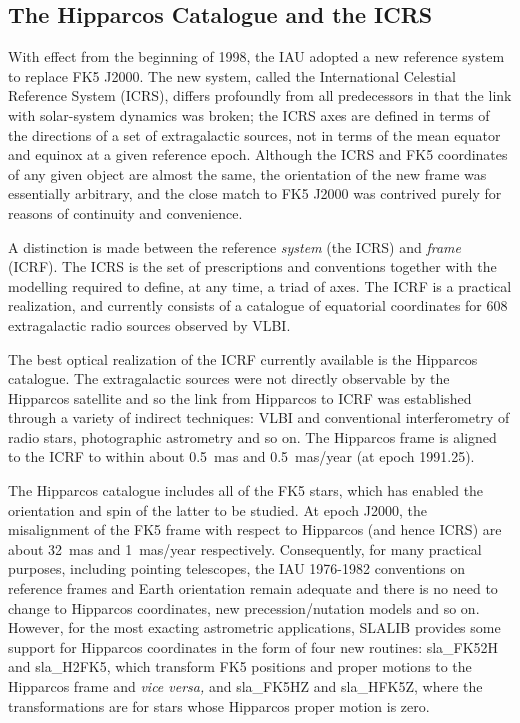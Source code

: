 \documentclass[11pt,twoside]{article}
\begin{document}
\subsection{The Hipparcos Catalogue and the ICRS}
With effect from the beginning of 1998, the IAU adopted a new
reference system to replace FK5 J2000.  The new system, called the
International Celestial Reference System (ICRS), differs profoundly
from all predecessors in that the link with solar-system dynamics
was broken;  the ICRS axes are defined in terms of the directions
of a set of extragalactic sources, not in terms of the mean equator and
equinox at a given reference epoch.  Although the ICRS and FK5 coordinates
of any given object are almost the same, the orientation of the new frame
was essentially arbitrary, and the close match to FK5 J2000 was contrived
purely for reasons of continuity and convenience.

A distinction is made between the reference {\it system}\/ (the ICRS)
and {\it frame}\/ (ICRF).  The ICRS is the set of prescriptions and
conventions together with the modelling required to define, at any
time, a triad of axes.  The ICRF is a practical realization, and
currently consists of a catalogue of equatorial coordinates for 608
extragalactic radio sources observed by VLBI.

The best optical realization of the ICRF currently available is the
Hipparcos catalogue.  The extragalactic sources were not directly
observable by the Hipparcos satellite and so the link from Hipparcos
to ICRF was established through a variety of indirect techniques: VLBI and
conventional interferometry of radio stars, photographic astrometry
and so on.  The Hipparcos frame is aligned to the ICRF to within about
0.5~mas and 0.5~mas/year (at epoch 1991.25).

The Hipparcos catalogue includes all of the FK5 stars, which has enabled
the orientation and spin of the latter to be studied.  At epoch J2000,
the misalignment of the FK5 frame with respect to Hipparcos
(and hence ICRS) are about 32~mas and 1~mas/year respectively.
Consequently, for many practical purposes, including pointing
telescopes, the IAU 1976-1982 conventions on reference frames and
Earth orientation remain adequate and there is no need to change to
Hipparcos coordinates, new precession/nutation models and so on.
However, for the most exacting astrometric applications, SLALIB
provides some support for Hipparcos coordinates in the form of
four new routines:
sla\_FK52H and
sla\_H2FK5,
which transform FK5 positions and proper motions to the Hipparcos frame
and {\it vice versa,}\/ and
sla\_FK5HZ and
sla\_HFK5Z,
where the transformations are for stars whose Hipparcos proper motion is
zero. 
\end{document}
